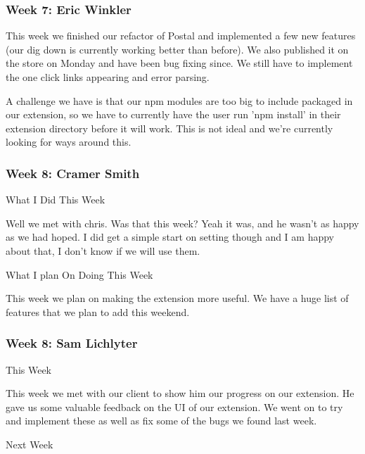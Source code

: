  \subsubsection{Week 7: Eric Winkler}

This week we finished our refactor of Postal and implemented a few new features (our dig down is currently working better than before). We also published it on the store on Monday and have been bug fixing since. We still have to implement the one click links appearing and error parsing. 



A challenge we have is that our npm modules are too big to include packaged in our extension, so we have to currently have the user run 'npm install' in their extension directory before it will work. This is not ideal and we're currently looking for ways around this. \\ 

 \subsubsection{Week 8: Cramer Smith}

What I Did This Week



Well we met with chris. Was that this week? Yeah it was, and he wasn't as happy as we had hoped. I did get a simple start on setting though and I am happy about that, I don't know if we will use them.



What I plan On Doing This Week



This week we plan on making the extension more useful. We have a huge list of features that we plan to add this weekend. \\ 

 \subsubsection{Week 8: Sam Lichlyter}

This Week



This week we met with our client to show him our progress on our extension. He gave us some valuable feedback on the UI of our extension. We went on to try and implement these as well as fix some of the bugs we found last week.



Next Week



